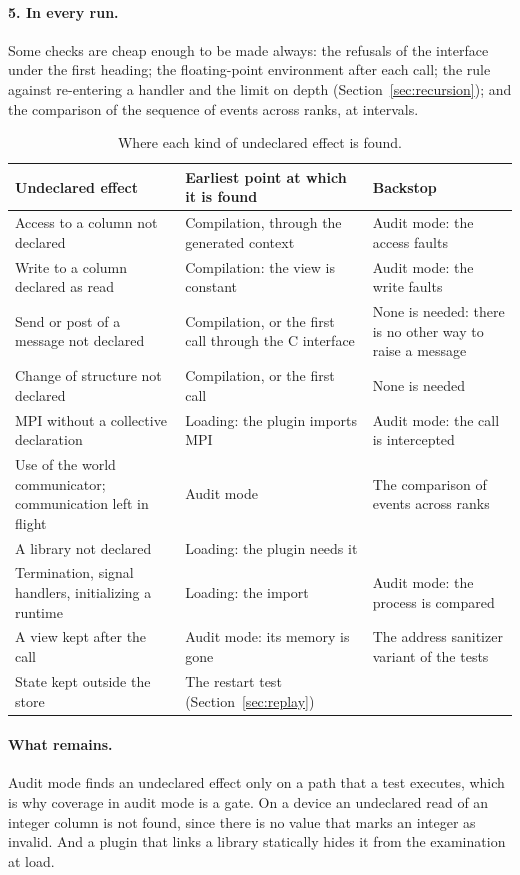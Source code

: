 \documentclass[11pt,a4paper]{article}
\begin{document}
\paragraph{5. In every run.}  Some checks are cheap enough to be made
always: the refusals of the interface under the first heading; the
floating-point environment after each call; the rule against re-entering a
handler and the limit on depth (Section~\ref{sec:recursion}); and the
comparison of the sequence of events across ranks, at intervals.

\begin{table}[ht]
\centering
\small
\begin{tabularx}{\textwidth}{@{}>{\raggedright\arraybackslash}p{40mm} L L@{}}
\toprule
Undeclared effect & Earliest point at which it is found & Backstop \\
\midrule
Access to a column not declared & Compilation, through the generated context & Audit mode: the access faults \\
Write to a column declared as read & Compilation: the view is constant & Audit mode: the write faults \\
Send or post of a message not declared & Compilation, or the first call through the C interface & None is needed: there is no other way to raise a message \\
Change of structure not declared & Compilation, or the first call & None is needed \\
MPI without a collective declaration & Loading: the plugin imports MPI & Audit mode: the call is intercepted \\
Use of the world communicator; communication left in flight & Audit mode & The comparison of events across ranks \\
A library not declared & Loading: the plugin needs it & \\
Termination, signal handlers, initializing a runtime & Loading: the import & Audit mode: the process is compared \\
A view kept after the call & Audit mode: its memory is gone & The address sanitizer variant of the tests \\
State kept outside the store & The restart test (Section~\ref{sec:replay}) & \\
\bottomrule
\end{tabularx}
\caption{Where each kind of undeclared effect is found.}
\label{tab:undeclared}
\end{table}

\paragraph{What remains.}  Audit mode finds an undeclared effect only on a
path that a test executes, which is why coverage in audit mode is a gate.
On a device an undeclared read of an integer column is not found, since
there is no value that marks an integer as invalid.  And a plugin that links
a library statically hides it from the examination at load.
\end{document}
